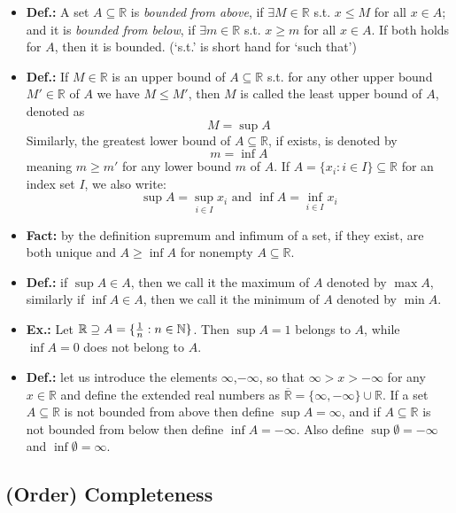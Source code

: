 \documentclass{article}
\begin{document}
\begin{itemize}
\item \textbf{Def.:} A set $A\subseteq \mathbb{R}$ is \textit{bounded} \textit{from above}, if $\exists M\in \mathbb{R}$ s.t.  $x\leq M$ for all $x\in A$; and it is \textit{bounded from below}, if $\exists m\in \mathbb{R}$ s.t.  $x\geq m$ for all $x\in A$. If both holds for $A$, then it is bounded.				(‘s.t.’ is short hand for ‘such that’)

\item \textbf{Def.:} If $M\in \mathbb{R}$ is an upper bound of $A\subseteq \mathbb{R}$ s.t. for any other upper bound $M'\in \mathbb{R}$ of $A$ we have $M\leq M'$, then $M$ is called the least upper bound of $A$, denoted as
\[
M=\sup A
\]
Similarly, the greatest lower bound of $A\subseteq \mathbb{R}$, if exists, is denoted by 
\[
m=\inf A
\]
  meaning $m\geq m'$ for any lower bound $m$ of $A$.
If $A=\{x_i: i\in I\}\subseteq \mathbb{R}$ for an index set $I$, we also write:
\[
\sup A=\sup_{i\in I}x_i \text{ and } \inf A = \inf_{i\in I}x_i
\]

\item \textbf{Fact:} by the definition supremum and infimum of a set, if they exist, are both unique and $A\geq \inf A$ for nonempty $A\subseteq \mathbb{R}$.

\item \textbf{Def.:} if $\sup A\in A$, then we call it the maximum of $A$ denoted by $\max A$, similarly if $\inf A \in A$, then we call it the minimum of $A$ denoted by $\min A$.

\item \textbf{Ex.:} Let $\mathbb{R}\supseteq A=\{{1\over n} : n\in \mathbb{N}\}$. Then $\sup A=1$ belongs to $A$, while $\inf A=0$ does not belong to $A$.

\item \textbf{Def.:} let us introduce the elements $\infty$,$-\infty$, so that $\infty >x>-\infty$ for any $x\in \mathbb{R}$ and define the extended real numbers as $\overline{\mathbb{R}}=\{\infty, -\infty\}\cup \mathbb{R}$. If a set $A\subseteq \mathbb{R}$ is not bounded from above then define $\sup A=\infty$, and if $A\subseteq \mathbb{R}$ is not bounded from below then define $\inf A=-\infty$. Also define $\sup \emptyset=-\infty$ and $\inf \emptyset = \infty$.
\end{itemize}

\subsection{(Order) Completeness}
\end{document}
